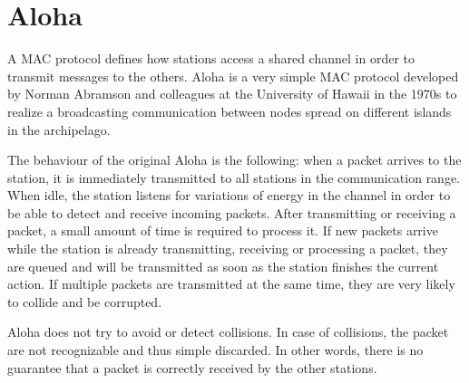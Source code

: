 \section{Aloha}
\label{sec:aloha}

A \ac{MAC} protocol defines how stations access a shared channel in order to transmit messages to the others.
Aloha is a very simple \ac{MAC} protocol developed by Norman Abramson and colleagues at the University of Hawaii in the 1970s to realize a broadcasting communication between nodes spread on different islands in the archipelago. 

The behaviour of the original Aloha is the following: when a packet arrives to the station, it is immediately transmitted to all stations in the communication range.
When idle, the station listens for variations of energy in the channel in order to be able to detect and receive incoming packets.
After transmitting or receiving a packet, a small amount of time is required to process it.
If new packets arrive while the station is already transmitting, receiving or processing a packet, they are queued and will be transmitted as soon as the station finishes the current action.
If multiple packets are transmitted at the same time, they are very likely to collide and be corrupted.

Aloha does not try to avoid or detect collisions.
In case of collisions, the packet are not recognizable and thus simple discarded.
In other words, there is no guarantee that a packet is correctly received by the other stations.
